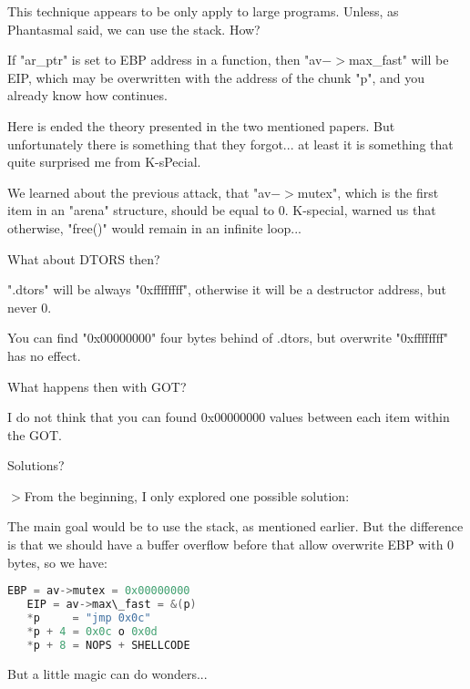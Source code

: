 \documentclass[12pt]{article}
\begin{document}
   This technique appears to be only apply to large programs. Unless,
   as Phantasmal said, we can use the stack. How?
\newline

   If "ar\_ptr" is set to EBP address in a function, then "av$->$max\_fast"
   will be EIP, which may be overwritten with the address of the chunk
   "p", and you already know how continues.
\newline

Here is ended the theory presented in the two mentioned papers. But
unfortunately there is something that they forgot... at least it is
something that quite surprised me from K-sPecial.
\newline

We learned about the previous attack, that "av$->$mutex", which is the first
item in an "arena" structure, should be equal to 0. K-special, warned us
that otherwise, "free()" would remain in an infinite loop...
\newline

What about DTORS then?
\newline

".dtors" will be always "0xffffffff", otherwise it will be a destructor
address, but never 0.
\newline

You can find "0x00000000" four bytes behind of .dtors, but overwrite
"0xffffffff" has no effect.
\newline

What happens then with GOT?
\newline

I do not think that you can found 0x00000000 values between each item
within the GOT.
\newline

Solutions?
\newline

$>$From the beginning, I only explored one possible solution:
\newline

The main goal would be to use the stack, as mentioned earlier. But the
difference is that we should have a buffer overflow before that allow
overwrite EBP with 0 bytes, so we have:

\begin{lstlisting}[language=C]
   EBP = av->mutex = 0x00000000
   EIP = av->max\_fast = &(p)
   *p     = "jmp 0x0c"
   *p + 4 = 0x0c o 0x0d
   *p + 8 = NOPS + SHELLCODE 
\end{lstlisting}
But a little magic can do wonders...
\newline
\end{document}
